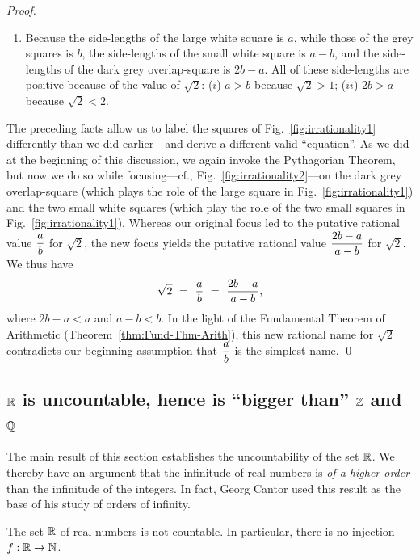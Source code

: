 \begin{proof}
\begin{enumerate}
\item
Because the side-lengths of the large white square is $a$, while those
of the grey squares is $b$, the side-lengths of the small white square
is $a-b$, and the side-lengths of the dark grey overlap-square is
$2b-a$.  All of these side-lengths are positive because of the value
of $\sqrt{2}$: ($i$) $a > b$ because $\sqrt{2} >1$; ($ii$) $2b >a$
because $\sqrt{2} < 2$.
\end{enumerate}
The preceding facts allow us to label the squares of
Fig.~\ref{fig:irrationality1} differently than we did earlier---and
derive a different valid ``equation''.  As we did at the beginning of
this discussion, we again invoke the Pythagorian Theorem, but now we
do so while focusing---cf., Fig.~\ref{fig:irrationality2}---on the
dark grey overlap-square (which plays the role of the large square in
Fig.~\ref{fig:irrationality1}) and the two small white squares (which
play the role of the two small squares in
Fig.~\ref{fig:irrationality1}).  Whereas our original focus led to the
putative rational value $\displaystyle {a \over b}$ for $\sqrt{2}$,
the new focus yields the putative rational value $\displaystyle {2b-a
  \over a-b}$ for $\sqrt{2}$.  We thus have
\[ \sqrt{2} \ = \ {a \over b} \ = \ {2b-a \over a-b}, \]
where $2b-a < a$ and $a-b < b$.  In the light of the Fundamental
Theorem of Arithmetic (Theorem~\ref{thm:Fund-Thm-Arith}), this new
rational name for $\sqrt{2}$ contradicts our beginning assumption that
$\displaystyle {a \over b}$ is the simplest name.
\qed
\end{proof}

\subsection{$\mathbb{R}$ is uncountable, hence is ``bigger than'' $\mathbb{Z}$ and $\mathbb{Q}$}
\label{sec:Q-Z-R-cardinality}
\label{sec:Reals-uncountable}


The main result of this section establishes the uncountability of the
set $\mathbb{R}$.  We thereby have an argument that the infinitude of real
numbers is {\em of a higher order} than the infinitude of the
integers.  In fact, Georg Cantor used this result as the base of
his study of orders of infinity.

\begin{prop}
\label{thm:R-uncountable}
The set $\mathbb{R}$ of real numbers is not countable.
In particular, there is no injection $f: \mathbb{R} \rightarrow \mathbb{N}$.
\end{prop}

